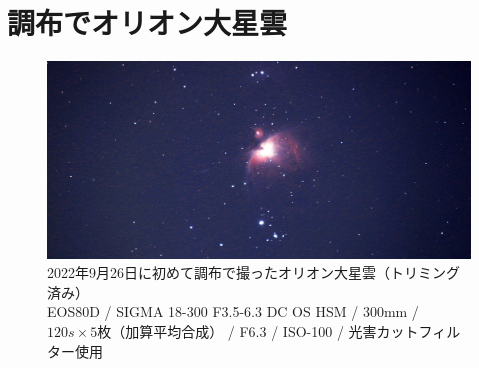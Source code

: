 \documentclass[supernova_2023]{subfiles}
\begin{document}
\chapter{調布でオリオン大星雲}
\begin{figure}[H]
  \centering
  \includegraphics[width=\textwidth]{figures/Yosuke/2022_09_26_Orion_crop.jpg}
  \caption{2022年9月26日に初めて調布で撮ったオリオン大星雲（トリミング済み）\mbox{}\\EOS80D / SIGMA 18-300 F3.5-6.3 DC OS HSM / 300mm / $120\si{s} \times 5枚$（加算平均合成） / F6.3 / ISO-100 / 光害カットフィルター使用 }
  \label{fig:firstOrion}
\end{figure}
\end{document}
